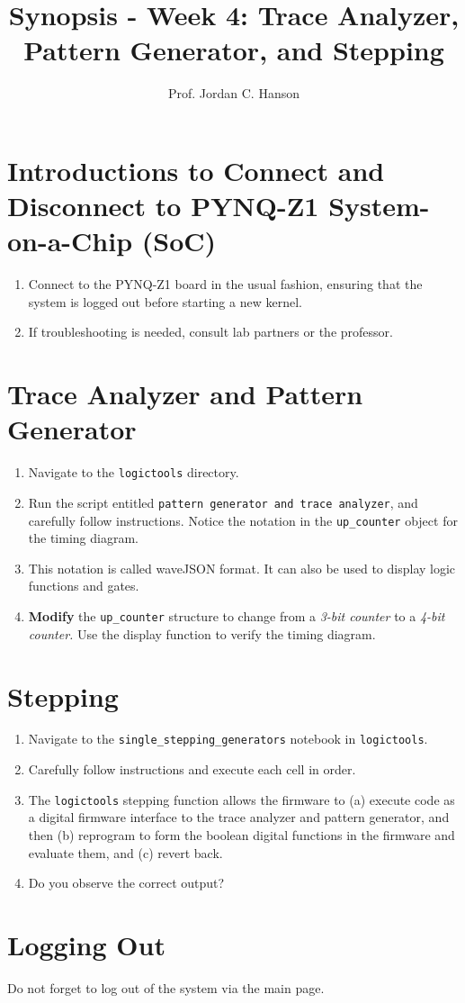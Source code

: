 \documentclass{article}
\begin{document}
\title{Synopsis - Week 4: Trace Analyzer, Pattern Generator, and Stepping}
\author{Prof. Jordan C. Hanson}

\maketitle

\section{Introductions to Connect and Disconnect to PYNQ-Z1 System-on-a-Chip (SoC)}

\begin{enumerate}
\item Connect to the PYNQ-Z1 board in the usual fashion, ensuring that the system is logged out before starting a new kernel.
\item If troubleshooting is needed, consult lab partners or the professor.
\end{enumerate}

\section{Trace Analyzer and Pattern Generator}

\begin{enumerate}
\item Navigate to the \verb+logictools+ directory.
\item Run the script entitled \verb+pattern generator and trace analyzer+, and carefully follow instructions.  Notice the notation in the \verb+up_counter+ object for the timing diagram.
\item This notation is called waveJSON format.  It can also be used to display logic functions and gates.
\item \textbf{Modify} the \verb+up_counter+ structure to change from a \textit{3-bit counter} to a \textit{4-bit counter.}  Use the display function to verify the timing diagram.
\end{enumerate}

\section{Stepping}

\begin{enumerate}
\item Navigate to the \verb+single_stepping_generators+ notebook in \verb+logictools+.
\item Carefully follow instructions and execute each cell in order.
\item The \verb+logictools+ stepping function allows the firmware to (a) execute code as a digital firmware interface to the trace analyzer and pattern generator, and then (b) reprogram to form the boolean digital functions in the firmware and evaluate them, and (c) revert back.
\item Do you observe the correct output?
\end{enumerate}

\section{Logging Out}

Do not forget to log out of the system via the main page.
\end{document}
